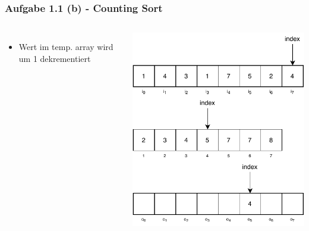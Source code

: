 \documentclass[aspectratio=169]{beamer}
\begin{document}
\begin{frame}
	\frametitle{Aufgabe 1.1 (b) - Counting Sort}
	\begin{columns}[c] %
	
	\begin{itemize}
		\item Wert im temp. array wird um 1 dekrementiert
	\end{itemize}
	
	\includegraphics[scale=.7]{cs12.pdf}
	
	\end{columns}
	\end{frame}
\end{document}
